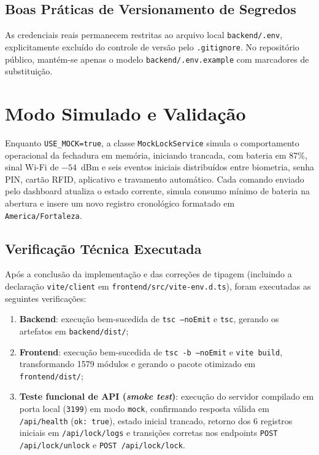 \documentclass[10pt,twocolumn,a4paper]{article}
\begin{document}
\subsection{Boas Pr\'aticas de Versionamento de Segredos}

As credenciais reais permanecem restritas ao arquivo local \texttt{backend/.env}, explicitamente exclu\'ido do controle de vers\~ao pelo \texttt{.gitignore}. No reposit\'orio p\'ublico, mant\'em-se apenas o modelo \texttt{backend/.env.example} com marcadores de substitui\c{c}\~ao.

\section{Modo Simulado e Valida\c{c}\~ao}

Enquanto \texttt{USE\_MOCK=true}, a classe \texttt{MockLockService} simula o comportamento operacional da fechadura em mem\'oria, iniciando trancada, com bateria em 87\%, sinal Wi-Fi de $-54$~dBm e seis eventos iniciais distribu\'idos entre biometria, senha PIN, cart\~ao RFID, aplicativo e travamento autom\'atico. Cada comando enviado pelo dashboard atualiza o estado corrente, simula consumo m\'inimo de bateria na abertura e insere um novo registro cronol\'ogico formatado em \texttt{America/Fortaleza}.

\subsection{Verifica\c{c}\~ao T\'ecnica Executada}

Ap\'os a conclus\~ao da implementa\c{c}\~ao e das corre\c{c}\~oes de tipagem (incluindo a declara\c{c}\~ao \texttt{vite/client} em \texttt{frontend/src/vite-env.d.ts}), foram executadas as seguintes verifica\c{c}\~oes:
\begin{enumerate}
  \item \textbf{Backend}: execu\c{c}\~ao bem-sucedida de \texttt{tsc --noEmit} e \texttt{tsc}, gerando os artefatos em \texttt{backend/dist/};
  \item \textbf{Frontend}: execu\c{c}\~ao bem-sucedida de \texttt{tsc -b --noEmit} e \texttt{vite build}, transformando 1579 m\'odulos e gerando o pacote otimizado em \texttt{frontend/dist/};
  \item \textbf{Teste funcional de API (\textit{smoke test})}: execu\c{c}\~ao do servidor compilado em porta local (\texttt{3199}) em modo \texttt{mock}, confirmando resposta v\'alida em \texttt{/api/health} (\texttt{ok: true}), estado inicial trancado, retorno dos 6 registros iniciais em \texttt{/api/lock/logs} e transi\c{c}\~oes corretas nos endpoints \texttt{POST /api/lock/unlock} e \texttt{POST /api/lock/lock}.
\end{enumerate}
\end{document}
